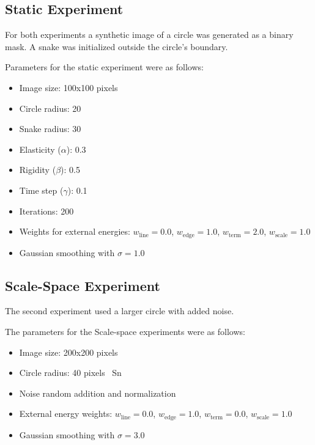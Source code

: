 \documentclass[10pt,twocolumn,letterpaper]{article}
\begin{document}
\subsection{Static Experiment}
For both experiments a synthetic image of a circle was generated as a binary mask. A snake was initialized outside the circle's boundary.

Parameters for the static experiment were as follows:
\begin{itemize}
    \item Image size: 100x100 pixels
    \item Circle radius: 20
    \item Snake radius: 30
    \item Elasticity ($\alpha$): 0.3
    \item Rigidity ($\beta$): 0.5
    \item Time step ($\gamma$): 0.1
    \item Iterations: 200
    \item Weights for external energies: $w_{\text{line}} = 0.0$, $w_{\text{edge}} = 1.0$, $w_{\text{term}} = 2.0$, $w_{\text{scale}} = 1.0$
    \item Gaussian smoothing with $\sigma = 1.0$
\end{itemize}

\subsection{Scale-Space Experiment}
The second experiment used a larger circle with added noise. 

The parameters for the Scale-space experiments were as follows:
\begin{itemize}
    \item Image size: 200x200 pixels
    \item Circle radius: 40 pixels
    \ Sn
    \item Noise random addition and normalization
    \item External energy weights: $w_{\text{line}} = 0.0$, $w_{\text{edge}} = 1.0$, $w_{\text{term}} = 0.0$, $w_{\text{scale}} = 1.0$
    \item Gaussian smoothing with $\sigma = 3.0$
\end{itemize}
\end{document}
